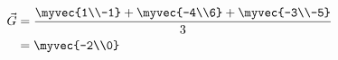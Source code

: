 \solution
\begin{equation}
\begin{split}
\label{eq:centroid}
    \vec{G}&= \frac{\myvec{1\\-1}+\myvec{-4\\6}+\myvec{-3\\-5}}{3}\\    
     &= \myvec{-2\\0}
\end{split}
\end{equation}

 



